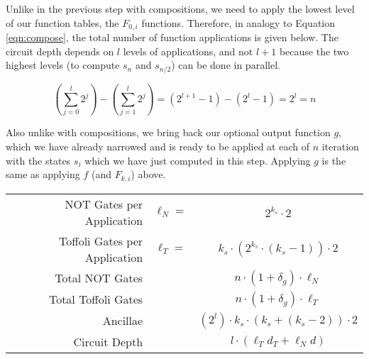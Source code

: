 Unlike in the previous step with compositions, we need to apply the
lowest level of our function tables, the $F_{0,i}$ functions. Therefore,
in analogy to Equation \ref{eqn:compose},
the total number of function applications is given below. The
circuit depth depends on $l$ levels of applications, and not $l+1$
because the two highest levels (to compute $s_n$ and $s_{n/2}$) can be
done in parallel.

\begin{equation}
\left( \sum_{j=0}^{l} 2^j \right) - \left( \sum_{j=1}^{l} 2^j \right)
= (2^{l+1} - 1) - (2^{l} - 1) = 2^l = n
\end{equation}

Also unlike with compositions, we bring back our optional output function
$g$, which we have already narrowed and is ready to be applied at each
of $n$
iteration with the states $s_i$ which we have just computed in this step.
Applying $g$ is the same as applying $f$ (and $F_{k,i}$) above.

\begin{table}
\begin{center}
\begin{tabular}{|r|cc|}
\hline
NOT Gates per Application & $\ell_N = $ & $2^{k_s} \cdot 2$ \\
Toffoli Gates per Application & $\ell_T = $ & $k_s \cdot (2^{k_s}\cdot (k_s-1)) \cdot 2$\\
Total NOT Gates & & $n \cdot (1 + \delta_g) \cdot \ell_N$ \\
Total Toffoli Gates & & $n \cdot (1 + \delta_g) \cdot \ell_T$ \\
Ancillae & & $(2^l)\cdot k_s \cdot (k_s + (k_s - 2)) \cdot 2$\\
Circuit Depth & & $l\cdot(\ell_T d_T + \ell_N d)$\\
\hline
\end{tabular}
\end{center}
\end{table}